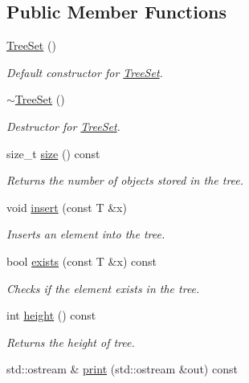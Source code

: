 \subsection*{Public Member Functions}
\begin{DoxyCompactItemize}
\item 
\hypertarget{class_tree_set_a915f05820dc9f0e2ef34263f05951c6d}{\hyperlink{class_tree_set_a915f05820dc9f0e2ef34263f05951c6d}{Tree\-Set} ()}\label{class_tree_set_a915f05820dc9f0e2ef34263f05951c6d}

\begin{DoxyCompactList}\small\item\em Default constructor for \hyperlink{class_tree_set}{Tree\-Set}. \end{DoxyCompactList}\item 
\hyperlink{class_tree_set_a698f6c217e682f1ab29da87d89dd16b6}{$\sim$\-Tree\-Set} ()
\begin{DoxyCompactList}\small\item\em Destructor for \hyperlink{class_tree_set}{Tree\-Set}. \end{DoxyCompactList}\item 
\hypertarget{class_tree_set_ab8819494cda32c08cf9217f3419e4ff3}{size\-\_\-t \hyperlink{class_tree_set_ab8819494cda32c08cf9217f3419e4ff3}{size} () const }\label{class_tree_set_ab8819494cda32c08cf9217f3419e4ff3}

\begin{DoxyCompactList}\small\item\em Returns the number of objects stored in the tree. \end{DoxyCompactList}\item 
void \hyperlink{class_tree_set_a04a78c1b3d70968c6547589c8add3d4a}{insert} (const T \&x)
\begin{DoxyCompactList}\small\item\em Inserts an element into the tree. \end{DoxyCompactList}\item 
bool \hyperlink{class_tree_set_aee288e3b9299f8fcbac0834543865128}{exists} (const T \&x) const 
\begin{DoxyCompactList}\small\item\em Checks if the element exists in the tree. \end{DoxyCompactList}\item 
int \hyperlink{class_tree_set_a00da9efa0cac8a3dab15fd1c23e0d2b4}{height} () const 
\begin{DoxyCompactList}\small\item\em Returns the height of tree. \end{DoxyCompactList}\item 
\hypertarget{class_tree_set_af2af42baedbdf6d0d2a8b794f3a9eaa4}{std\-::ostream \& \hyperlink{class_tree_set_af2af42baedbdf6d0d2a8b794f3a9eaa4}{print} (std\-::ostream \&out) const }\label{class_tree_set_af2af42baedbdf6d0d2a8b794f3a9eaa4}


\end{DoxyCompactItemize}
